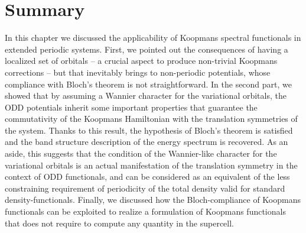 \section{Summary\label{sec:ch4-summary}}
In this chapter we discussed the applicability of Koopmans spectral functionals in extended periodic systems. First, we pointed out the consequences of having a localized set of orbitals -- a crucial aspect to produce non-trivial Koopmans corrections -- but that inevitably brings to non-periodic potentials, whose compliance with Bloch's theorem is not straightforward. In the second part, we showed that by assuming a Wannier character for the variational orbitals, the ODD potentials inherit some important properties that guarantee the commutativity of the Koopmans Hamiltonian with the translation symmetries of the system. Thanks to this result, the hypothesis of Bloch's theorem is satisfied and the band structure description of the energy spectrum is recovered. As an aside, this suggests that the condition of the Wannier-like character for the variational orbitals is an actual manifestation of the translation symmetry in the context of ODD functionals, and can be considered as an equivalent of the less constraining requirement of periodicity of the total density valid for standard density-functionals. Finally, we discussed how the Bloch-compliance of Koopmans functionals can be exploited to realize a formulation of Koopmans functionals that does not require to compute any quantity in the supercell.
